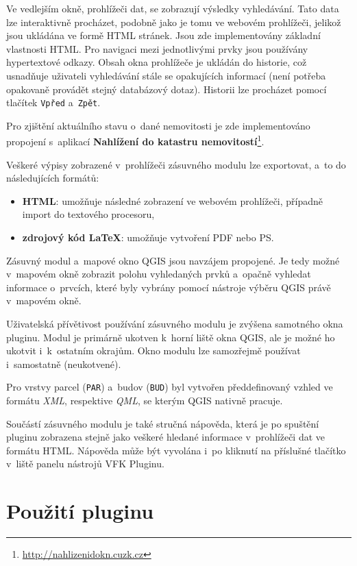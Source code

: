 \documentclass[a4paper,12pt,oneside]{book}
\newcommand{\latex}{\LaTeX}
\begin{document}
Ve vedlejším okně, prohlížeči dat, se zobrazují výsledky
vyhledávání. Tato data lze interaktivně procházet, podobně jako je
tomu ve webovém prohlížeči, jelikož jsou ukládána ve formě HTML
stránek. Jsou zde implementovány základní vlastnosti HTML. Pro
navigaci mezi jednotlivými prvky jsou používány hypertextové
odkazy. Obsah okna prohlížeče je ukládán do historie, což usnadňuje
uživateli vyhledávání stále se opakujících informací (není potřeba
opakovaně provádět stejný databázový dotaz). Historii lze procházet
pomocí tlačítek \texttt{Vpřed} a~\texttt{Zpět}.

Pro zjištění aktuálního stavu o~dané nemovitosti je zde implementováno
propojení s~aplikací \textbf{Nahlížení do katastru
  nemovitostí}\footnote{\url{http://nahlizenidokn.cuzk.cz}}.

Veškeré výpisy zobrazené v~prohlížeči zásuvného modulu lze exportovat,
a~to do následujících formátů:

\begin{itemize}
 \item \textbf{HTML}: umožňuje následné zobrazení ve webovém prohlížeči, případně import do textového procesoru,
 \item \textbf{zdrojový kód \latex}: umožňuje vytvoření PDF nebo PS.
\end{itemize}

Zásuvný modul a~mapové okno QGIS jsou navzájem propojené. Je tedy
možné v~mapovém okně zobrazit polohu vyhledaných prvků a~opačně
vyhledat informace o~prvcích, které byly vybrány pomocí nástroje
výběru QGIS právě v~mapovém okně.

Uživatelská přívětivost používání zásuvného modulu je zvýšena
 samotného okna pluginu. Modul je primárně ukotven
k~horní liště okna QGIS, ale je možné ho ukotvit i~k~ostatním
okrajům. Okno modulu lze samozřejmě používat i~samostatně
(neukotvené).

Pro vrstvy parcel (\texttt{PAR}) a~budov (\texttt{BUD}) byl vytvořen
předdefinovaný vzhled ve formátu \textit{XML}, respektive
\textit{QML}, se kterým QGIS nativně pracuje.

Součástí zásuvného modulu je také stručná nápověda, která je po
spuštění pluginu zobrazena stejně jako veškeré hledané informace
v~prohlížeči dat ve formátu HTML. Nápověda může být vyvolána i~po
kliknutí na příslušné tlačítko v~liště panelu nástrojů VFK
Pluginu. \cite{cvut_vfkPlugin}

\newpage
\section{Použití pluginu}
\end{document}

